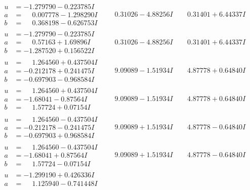 \documentclass[1p]{elsarticle_modified}
\theoremstyle{definition}
\begin{document}
$$\begin{array}{c|c|c}
\begin{aligned}
u &= -1.279790 - 0.223785 I \\
a &= \phantom{-}0.007778 - 1.298290 I \\
b &= \phantom{-}0.368198 - 0.626753 I\end{aligned}
 & \phantom{-}0.31026 - 4.88256 I & \phantom{-}0.31401 + 6.44337 I \\ \hline\begin{aligned}
u &= -1.279790 - 0.223785 I \\
a &= \phantom{-}0.57163 + 1.69896 I \\
b &= -1.287520 + 0.156522 I\end{aligned}
 & \phantom{-}0.31026 - 4.88256 I & \phantom{-}0.31401 + 6.44337 I \\ \hline\begin{aligned}
u &= \phantom{-}1.264560 + 0.437504 I \\
a &= -0.212178 + 0.241475 I \\
b &= -0.697903 - 0.968584 I\end{aligned}
 & \phantom{-}9.09089 - 1.51934 I & \phantom{-}4.87778 + 0.64840 I \\ \hline\begin{aligned}
u &= \phantom{-}1.264560 + 0.437504 I \\
a &= -1.68041 - 0.87564 I \\
b &= \phantom{-}1.57724 + 0.07154 I\end{aligned}
 & \phantom{-}9.09089 - 1.51934 I & \phantom{-}4.87778 + 0.64840 I \\ \hline\begin{aligned}
u &= \phantom{-}1.264560 - 0.437504 I \\
a &= -0.212178 - 0.241475 I \\
b &= -0.697903 + 0.968584 I\end{aligned}
 & \phantom{-}9.09089 + 1.51934 I & \phantom{-}4.87778 - 0.64840 I \\ \hline\begin{aligned}
u &= \phantom{-}1.264560 - 0.437504 I \\
a &= -1.68041 + 0.87564 I \\
b &= \phantom{-}1.57724 - 0.07154 I\end{aligned}
 & \phantom{-}9.09089 + 1.51934 I & \phantom{-}4.87778 - 0.64840 I \\ \hline\begin{aligned}
u &= -1.299190 + 0.426336 I \\
a &= \phantom{-}1.125940 - 0.741448 I \\

\end{aligned}
\end{array}$$
\end{document}
